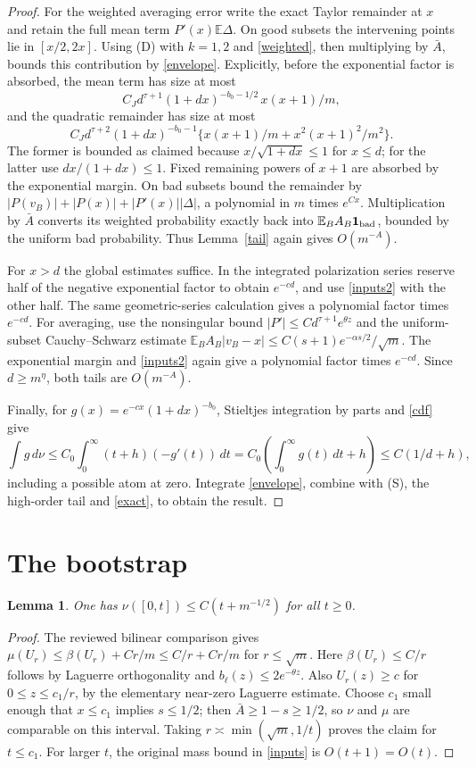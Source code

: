 \documentclass[11pt]{article}
\newtheorem{lemma}{Lemma}
\newcommand{\E}{\mathbb E}
\begin{document}
\begin{proof}
For the weighted averaging error write the exact Taylor remainder
at $x$ and retain the full mean term $P'(x)\E\Delta$.
On good subsets the intervening points lie in $[x/2,2x]$.
Using (D) with $k=1,2$ and \eqref{weighted}, then multiplying by
$\bar A$, bounds this contribution by \eqref{envelope}.
Explicitly, before the exponential factor is absorbed, the mean term
has size at most
\[
 C_J d^{\tau+1}(1+dx)^{-b_0-1/2}\,x(x+1)/m,
\]
and the quadratic remainder has size at most
\[
 C_J d^{\tau+2}(1+dx)^{-b_0-1}
       \{x(x+1)/m+x^2(x+1)^2/m^2\}.
\]
The former is bounded as claimed because
$x/\sqrt{1+dx}\le1$ for $x\le d$; for the latter use
$dx/(1+dx)\le1$. Fixed remaining powers of $x+1$ are absorbed by
the exponential margin. On bad subsets bound the remainder by
$|P(v_B)|+|P(x)|+|P'(x)||\Delta|$, a polynomial in $m$ times $e^{Cx}$.
Multiplication by $\bar A$ converts its weighted probability exactly
back into $\E_B A_B\boldsymbol1_{\rm bad}$, bounded by the uniform
bad probability. Thus Lemma~\ref{tail} again gives $O(m^{-A})$.

For $x>d$ the global estimates suffice. In the integrated polarization
series reserve half of the negative exponential factor to obtain
$e^{-cd}$, and use \eqref{inputs2} with the other half. The same
geometric-series calculation gives a polynomial factor times $e^{-cd}$.
For averaging, use the nonsingular bound
$|P'|\le C d^{\tau+1}e^{\theta z}$ and the uniform-subset
Cauchy--Schwarz estimate
$\E_B A_B|v_B-x|\le C(s+1)e^{-\alpha s/2}/\sqrt m$.
The exponential margin and \eqref{inputs2} again give a polynomial
factor times $e^{-cd}$. Since $d\ge m^\eta$, both tails are
$O(m^{-A})$.

Finally, for $g(x)=e^{-cx}(1+dx)^{-b_0}$, Stieltjes integration by
parts and \eqref{cdf} give
\[
 \int g\,d\nu
 \le C_0\int_0^\infty(t+h)(-g'(t))\,dt
 =C_0\left(\int_0^\infty g(t)\,dt+h\right)
 \le C(1/d+h),
\]
including a possible atom at zero. Integrate \eqref{envelope}, combine
with (S), the high-order tail and \eqref{exact}, to obtain the result.
\end{proof}

\section*{The bootstrap}
\begin{lemma}\label{base}
One has $\nu([0,t])\le C(t+m^{-1/2})$ for all $t\ge0$.
\end{lemma}
\begin{proof}
The reviewed bilinear comparison gives
$\mu(U_r)\le\beta(U_r)+Cr/m\le C/r+Cr/m$ for $r\le\sqrt m$.
Here $\beta(U_r)\le C/r$ follows by Laguerre orthogonality and
$b_\ell(z)\le2e^{-\theta z}$. Also $U_r(z)\ge c$ for
$0\le z\le c_1/r$, by the elementary near-zero Laguerre estimate.
Choose $c_1$ small enough that $x\le c_1$ implies $s\le1/2$;
then $\bar A\ge1-s\ge1/2$, so $\nu$ and $\mu$ are comparable
on this interval. Taking $r\asymp\min(\sqrt m,1/t)$ proves the
claim for $t\le c_1$. For larger $t$, the original mass bound
in \eqref{inputs} is $O(t+1)=O(t)$.
\end{proof}
\end{document}
